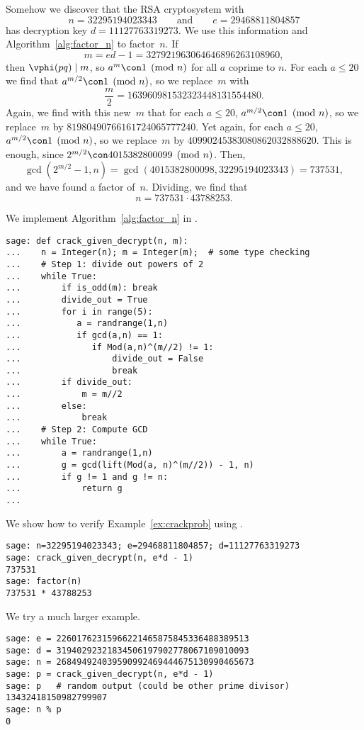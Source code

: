 \begin{example}\label{ex:crackprob}
Somehow we discover that the RSA cryptosystem with
$$
n=32295194023343\qquad\text{and}\qquad e=29468811804857
$$
has decryption
key $d= 11127763319273$.  We use this information and
Algorithm~\ref{alg:factor_n} to factor~$n$.
If
$$m = ed-1 = 327921963064646896263108960,$$
then $\vphi(pq)\mid m$, so $a^m\con 1\pmod{n}$
for all $a$ coprime to $n$.
For each $a\leq 20$ we find that
$a^{m/2}\con 1\pmod{n}$, so we replace~$m$ with
$$\frac{m}{2}= 163960981532323448131554480.$$
Again, we find with this new~$m$ that
for each $a\leq 20$,
$a^{m/2}\con 1\pmod{n}$, so we replace~$m$ by
$81980490766161724065777240$.
Yet again, for each $a\leq 20$,
$a^{m/2}\con 1\pmod{n}$, so we replace~$m$
by $40990245383080862032888620$.
This is enough, since
$2^{m/2} \con 4015382800099\pmod{n}$.
Then,
$$
  \gcd(2^{m/2}-1,n) = \gcd(4015382800098,32295194023343) = 737531,
$$
and we have found a factor of~$n$.  Dividing, we find that
$$
  n = 737531 \cdot 43788253.
$$
\end{example}
\begin{sg}
We implement Algorithm~\ref{alg:factor_n} in \sage.
\begin{verbatim}
sage: def crack_given_decrypt(n, m):
...    n = Integer(n); m = Integer(m);  # some type checking
...    # Step 1: divide out powers of 2
...    while True:
...        if is_odd(m): break
...        divide_out = True
...        for i in range(5):
...           a = randrange(1,n)
...           if gcd(a,n) == 1:
...              if Mod(a,n)^(m//2) != 1:
...                  divide_out = False
...                  break
...        if divide_out:
...            m = m//2
...        else:
...            break
...    # Step 2: Compute GCD
...    while True:
...        a = randrange(1,n)
...        g = gcd(lift(Mod(a, n)^(m//2)) - 1, n)
...        if g != 1 and g != n:
...            return g
...
\end{verbatim}%
\noindent{}We show how to verify Example~\ref{ex:crackprob} using \sage.
\begin{verbatim}
sage: n=32295194023343; e=29468811804857; d=11127763319273
sage: crack_given_decrypt(n, e*d - 1)
737531
sage: factor(n)
737531 * 43788253
\end{verbatim}%

\noindent{}We try a much larger example.
\begin{verbatim}
sage: e = 22601762315966221465875845336488389513
sage: d = 31940292321834506197902778067109010093
sage: n = 268494924039590992469444675130990465673
sage: p = crack_given_decrypt(n, e*d - 1)
sage: p   # random output (could be other prime divisor)
13432418150982799907
sage: n % p
0
\end{verbatim}
\end{sg}

